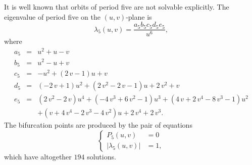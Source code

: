 \documentclass[12pt,a4paper]{amsart}
\numberwithin{equation}{section}
\numberwithin{lause}{section}
\begin{document}
  It is well known that orbits of period five are not solvable explicitly.
The eigenvalue of period five on the $(u,v)$-plane is
\begin{equation}
\lambda_{5}(u,v)=\frac{a_{5}b_{5}c_{5}d_{5}e_{5}}{u^{6}},\label{105.1}
\end{equation}
where
\begin{eqnarray*}
a_{5}&=&u^2+u-v\\
b_{5}&=&u^2-u+v\\
c_{5}&=&-{u}^{2}+ \left( 2\,v-1 \right) u+v\\
d_{5}&=&\left( -2\,v+1 \right) {u}^{2}+ \left( 2\,{v}^{2}-2\,v-1 \right) u+2\,{v}^{2}+v\\
e_{5}&=&\left( 2\,{v}^{2}-2\,v \right) {u}^{4}+ \left( -4\,{v}^{3}+6\,{v}^{2}-1 \right) {u}^{3}+ \left( 4\,v+2\,{v}^{4}-8\,{v}^{3}-1 \right) {u}^{2}\\
&&+ \left( v+4\,{v}^{4}-2\,{v}^{3}-4\,{v}^{2} \right) u+2\,{v}^{4}+2\,{v}^{3}.
\end{eqnarray*}
The bifurcation points are produced by the pair of equations
\begin{displaymath}
\left\{\begin{array}{ll}
      P_{5}(u,v)&=0\\
      |\lambda_{5}(u,v)|&=1,
\end{array}\right.
\end{displaymath}
which have altogether $194$ solutions.
\end{document}
